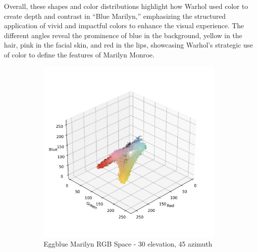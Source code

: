 \documentclass{article}
\begin{document}
Overall, these shapes and color distributions highlight how Warhol used
color to create depth and contrast in ``Blue Marilyn,'' emphasizing the
structured application of vivid and impactful colors to enhance the
visual experience. The different angles reveal the prominence of blue in
the background, yellow in the hair, pink in the facial skin, and red in
the lips, showcasing Warhol's strategic use of color to define the
features of Marilyn Monroe.

\begin{figure}[ht]
  \centering
  \begin{subfigure}{0.45\textwidth}
    \includegraphics[width=\textwidth]{main_files/figure-latex/4_17_eggblue_marilyn_original_scatter.jpg}
    \caption{Eggblue Marilyn RGB Space - 30 \degree elevation, 45 \degree azimuth}
    \label{fig:4_17_eggblue_marilyn_original_scatter}
  \end{subfigure}
  \hfill
  \begin{subfigure}{0.45\textwidth}

\end{subfigure}
\end{figure}
\end{document}
